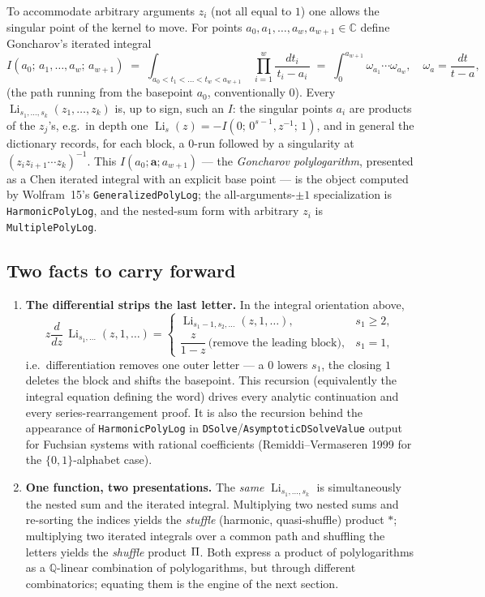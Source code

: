 \documentclass[11pt]{article}
\DeclareMathOperator{\Li}{Li}
\newcommand{\shuffle}{\mathbin{\rotatebox[origin=c]{180}{\ensuremath{\amalg}}}}
\theoremstyle{plain}
\theoremstyle{remark}
\begin{document}
To accommodate arbitrary arguments $z_i$ (not all equal to $1$) one allows the singular point of the kernel to move. For points $a_0,a_1,\dots,a_w,a_{w+1}\in\mathbb{C}$ define Goncharov's iterated integral
\[
  I(a_0;\,a_1,\dots,a_w;\,a_{w+1})
  \;=\;\int_{a_0<t_1<\dots<t_w<a_{w+1}}\ \prod_{i=1}^{w}\frac{dt_i}{\,t_i-a_i\,}
  \;=\;\int_0^{a_{w+1}}\omega_{a_1}\cdots\omega_{a_w},\quad \omega_a=\frac{dt}{t-a},
\]
(the path running from the basepoint $a_0$, conventionally $0$). Every $\Li_{s_1,\dots,s_k}(z_1,\dots,z_k)$ is, up to sign, such an $I$: the singular points $a_i$ are products of the $z_j$'s, e.g.\ in depth one $\Li_s(z)=-I(0;\,0^{s-1},z^{-1};\,1)$, and in general the dictionary records, for each block, a $0$-run followed by a singularity at $(z_iz_{i+1}\cdots z_k)^{-1}$. This $I(a_0;\mathbf a;a_{w+1})$ --- the \emph{Goncharov polylogarithm}, presented as a Chen iterated integral with an explicit base point --- is the object computed by Wolfram~15's \texttt{GeneralizedPolyLog}; the all-arguments-$\pm1$ specialization is \texttt{HarmonicPolyLog}, and the nested-sum form with arbitrary $z_i$ is \texttt{MultiplePolyLog}.

\subsection{Two facts to carry forward}

\begin{enumerate}
\item[(1)] \textbf{The differential strips the last letter.} In the integral orientation above,
\[
  z\frac{d}{dz}\,\Li_{s_1,\dots}(z,1,\dots)=\begin{cases}\Li_{s_1-1,s_2,\dots}(z,1,\dots),& s_1\ge2,\\[2pt]
  \dfrac{z}{1-z}\,\text{(remove the leading block)},& s_1=1,\end{cases}
\]
i.e.\ differentiation removes one outer letter --- a $0$ lowers $s_1$, the closing $1$ deletes the block and shifts the basepoint. This recursion (equivalently the integral equation defining the word) drives every analytic continuation and every series-rearrangement proof. It is also the recursion behind the appearance of \texttt{HarmonicPolyLog} in \texttt{DSolve}/\texttt{AsymptoticDSolveValue} output for Fuchsian systems with rational coefficients (Remiddi--Vermaseren 1999 for the $\{0,1\}$-alphabet case).
\item[(2)] \textbf{One function, two presentations.} The \emph{same} $\Li_{s_1,\dots,s_k}$ is simultaneously the nested sum and the iterated integral. Multiplying two nested sums and re-sorting the indices yields the \emph{stuffle} (harmonic, quasi-shuffle) product $\ast$; multiplying two iterated integrals over a common path and shuffling the letters yields the \emph{shuffle} product $\shuffle$. Both express a product of polylogarithms as a $\mathbb{Q}$-linear combination of polylogarithms, but through different combinatorics; equating them is the engine of the next section.
\end{enumerate}
\end{document}
